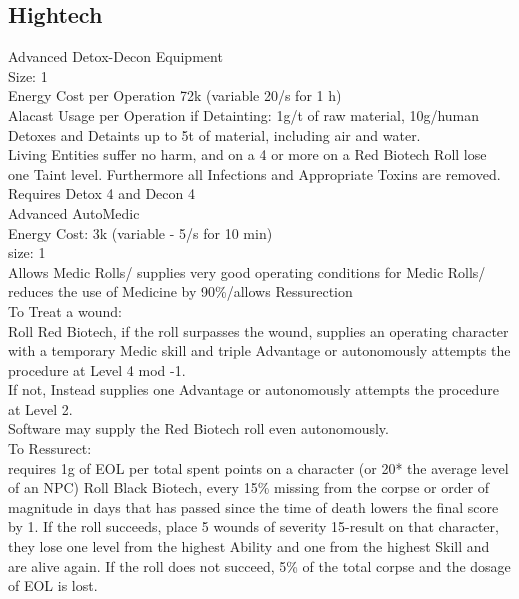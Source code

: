 \subsection{Hightech}
Advanced Detox-Decon Equipment \\
Size: 1\\
Energy Cost per Operation 72k (variable 20/s for 1 h)\\
Alacast Usage per Operation if Detainting: 1g/t of raw material, 10g/human\\
Detoxes and Detaints up to 5t of material, including air and water.\\
Living Entities suffer no harm, and on a 4 or more on a Red Biotech Roll lose one Taint level.
Furthermore all Infections and Appropriate Toxins are removed.\\
Requires Detox 4 and Decon 4\\
\newline
Advanced AutoMedic\\
Energy Cost: 3k (variable - 5/s for 10 min)\\
size: 1\\
Allows Medic Rolls/ supplies very good operating conditions for Medic Rolls/ reduces the use of Medicine by 90\%/allows Ressurection\\
To Treat a wound:\\
Roll Red Biotech, if the roll surpasses the wound, supplies an operating character with a temporary Medic skill and
triple Advantage or autonomously attempts the procedure at Level 4 mod -1.\\
If not, Instead supplies one Advantage or autonomously attempts the procedure at Level 2.\\
Software may supply the Red Biotech roll even autonomously.\\
To Ressurect:\\
requires 1g of EOL per total spent points on a character (or 20* the average level of an NPC)
Roll Black Biotech, every 15\% missing from the corpse or order of magnitude in days that has passed since the time of death
lowers the final score by 1.
If the roll succeeds, place 5 wounds of severity 15-result on that character, they lose
one level from the highest Ability and one from the highest Skill and are alive again.
If the roll does not succeed,
5\% of the total corpse and the dosage of EOL is lost.
\newline